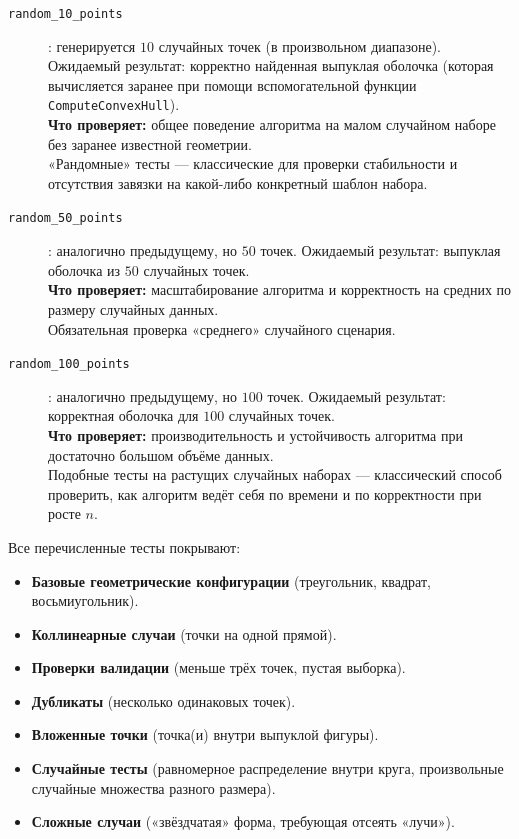 \documentclass[12pt,a4paper]{article}
\begin{document}
\begin{description}
  \item[\texttt{random\_10\_points}]: генерируется \(10\) случайных точек (в произвольном диапазоне). Ожидаемый результат: корректно найденная выпуклая оболочка (которая вычисляется заранее при помощи вспомогательной функции \texttt{ComputeConvexHull}).  
    \\
    \textbf{Что проверяет:} 
    общее поведение алгоритма на малом случайном наборе без заранее известной геометрии.  
    \\
    «Рандомные» тесты — классические для проверки стабильности и отсутствия завязки на какой-либо конкретный шаблон набора.

  \item[\texttt{random\_50\_points}]: аналогично предыдущему, но \(50\) точек.  
    Ожидаемый результат: выпуклая оболочка из \(50\) случайных точек.  
    \\
    \textbf{Что проверяет:} 
    масштабирование алгоритма и корректность на средних по размеру случайных данных.  
    \\
    Обязательная проверка «среднего» случайного сценария.

  \item[\texttt{random\_100\_points}]: аналогично предыдущему, но \(100\) точек.  
    Ожидаемый результат: корректная оболочка для \(100\) случайных точек.  
    \\
    \textbf{Что проверяет:} 
    производительность и устойчивость алгоритма при достаточно большом объёме данных.  
    \\
    Подобные тесты на растущих случайных наборах — классический способ проверить, как алгоритм ведёт себя по времени и по корректности при росте \(n\).
\end{description}

\noindent
Все перечисленные тесты покрывают:
\begin{itemize}
  \item \textbf{Базовые геометрические конфигурации} (треугольник, квадрат, восьмиугольник).
  \item \textbf{Коллинеарные случаи} (точки на одной прямой).
  \item \textbf{Проверки валидации} (меньше трёх точек, пустая выборка).
  \item \textbf{Дубликаты} (несколько одинаковых точек).
  \item \textbf{Вложенные точки} (точка(и) внутри выпуклой фигуры).
  \item \textbf{Случайные тесты} (равномерное распределение внутри круга, произвольные случайные множества разного размера).
  \item \textbf{Сложные случаи} («звёздчатая» форма, требующая отсеять «лучи»).
\end{itemize}
\end{document}
